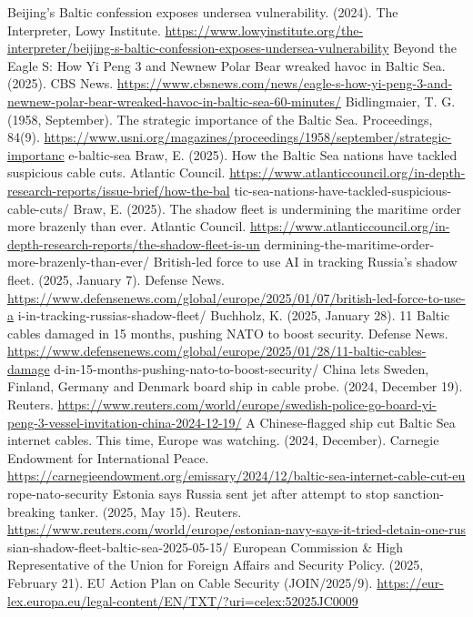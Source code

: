 
\begin{referencelist}
   Beijing's Baltic confession exposes undersea vulnerability. (2024). The Interpreter, Lowy Institute. \url{https://www.lowyinstitute.org/the-interpreter/beijing-s-baltic-confession-exposes-undersea-vulnerability}
   Beyond the Eagle S: How Yi Peng 3 and Newnew Polar Bear wreaked havoc in Baltic Sea. (2025). CBS News. \url{https://www.cbsnews.com/news/eagle-s-how-yi-peng-3-and-newnew-polar-bear-wreaked-havoc-in-baltic-sea-60-minutes/}
   Bidlingmaier, T. G. (1958, September). The strategic importance of the Baltic Sea. Proceedings, 84(9). \url{https://www.usni.org/magazines/proceedings/1958/september/strategic-importanc} e-baltic-sea
   Braw, E. (2025). How the Baltic Sea nations have tackled suspicious cable cuts. Atlantic Council. \url{https://www.atlanticcouncil.org/in-depth-research-reports/issue-brief/how-the-bal} tic-sea-nations-have-tackled-suspicious-cable-cuts/
   Braw, E. (2025). The shadow fleet is undermining the maritime order more brazenly than ever. Atlantic Council. \url{https://www.atlanticcouncil.org/in-depth-research-reports/the-shadow-fleet-is-un} dermining-the-maritime-order-more-brazenly-than-ever/
   British-led force to use AI in tracking Russia's shadow fleet. (2025, January 7). Defense News. \url{https://www.defensenews.com/global/europe/2025/01/07/british-led-force-to-use-a} i-in-tracking-russias-shadow-fleet/
   Buchholz, K. (2025, January 28). 11 Baltic cables damaged in 15 months, pushing NATO to boost security. Defense News. \url{https://www.defensenews.com/global/europe/2025/01/28/11-baltic-cables-damage} d-in-15-months-pushing-nato-to-boost-security/
   China lets Sweden, Finland, Germany and Denmark board ship in cable probe. (2024, December 19). Reuters. \url{https://www.reuters.com/world/europe/swedish-police-go-board-yi-peng-3-vessel-invitation-china-2024-12-19/}
   A Chinese-flagged ship cut Baltic Sea internet cables. This time, Europe was watching. (2024, December). Carnegie Endowment for International Peace. \url{https://carnegieendowment.org/emissary/2024/12/baltic-sea-internet-cable-cut-eu} rope-nato-security
   Estonia says Russia sent jet after attempt to stop sanction-breaking tanker. (2025, May 15). Reuters. \url{https://www.reuters.com/world/europe/estonian-navy-says-it-tried-detain-one-rus} sian-shadow-fleet-baltic-sea-2025-05-15/
   European Commission \& High Representative of the Union for Foreign Affairs and Security Policy. (2025, February 21). EU Action Plan on Cable Security (JOIN/2025/9). \url{https://eur-lex.europa.eu/legal-content/EN/TXT/?uri=celex:52025JC0009}

\end{referencelist}
